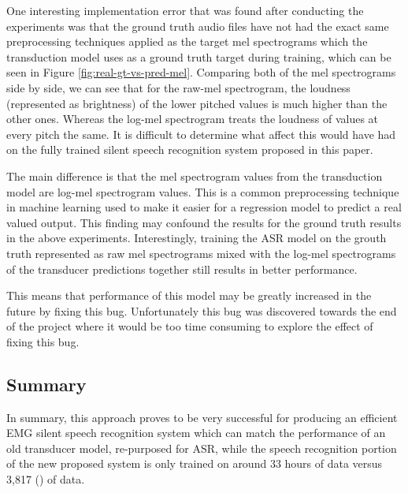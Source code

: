 One interesting implementation error that was found after conducting the experiments
was that the ground truth audio files have not had the exact same preprocessing techniques
applied as the target mel spectrograms which the transduction model uses as a ground truth
target during training, which can be seen in Figure \ref{fig:real-gt-vs-pred-mel}.
Comparing both of the mel spectrograms side by side, we can see
that for the raw-mel spectrogram, the loudness (represented as brightness) of the lower
pitched values is much higher than the other ones. Whereas the log-mel spectrogram
treats the loudness of values at every pitch the same. It is difficult to determine what
affect this would have had on the fully trained silent speech recognition system
proposed in this paper.

The main difference is that the mel spectrogram values from the transduction model are
log-mel spectrogram values. This is a common preprocessing technique in machine learning
used to make it easier for a regression model to predict a real valued output. This finding
may confound the results for the ground truth results in the above experiments. Interestingly,
training the ASR model on the grouth truth represented as raw mel spectrograms mixed
with the log-mel spectrograms of the transducer predictions together still results in better
performance.

This means that performance of this model may be greatly increased in the future by fixing
this bug. Unfortunately this bug was discovered towards the end of the project where it would
be too time consuming to explore the effect of fixing this bug.

\subsection{Summary}

In summary, this approach proves to be very successful for producing
an efficient EMG silent speech recognition system which can match the
performance of an old transducer model, re-purposed for ASR, while
the speech recognition portion of the new proposed system is only trained
on around 33 hours of data versus 3,817 (\cite{deepspeech0.7.0-training-ref}) of data.